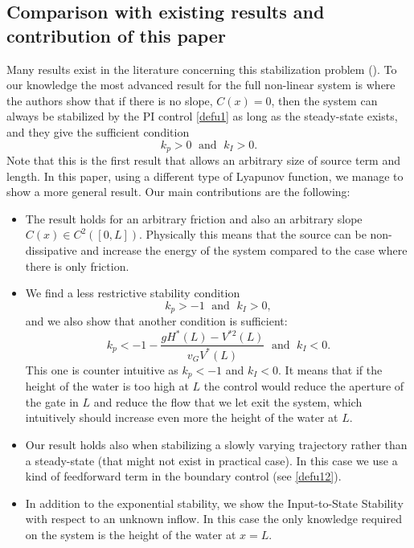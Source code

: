 \subsection{Comparison with existing results and contribution of this paper}
Many results exist in the literature concerning this stabilization problem (\eg \cite{dos2008, XuSallet, BastinCoron2013, XuSallet2014, Trinh2015, BastinCoronTamasoiu2015, BastinCoronPI}). To our knowledge the most advanced result for the full non-linear system is \cite{BastinCoronPI} where the authors show that if there is no slope, \ie $C(x) = 0$, then the system can always be stabilized by the PI control \eqref{defu1} as long as the steady-state exists, and they give the sufficient condition
\begin{equation*}%
k_{p}>0\;\text{ and }\;k_{I}>0.
\end{equation*}
Note that this is the first result that allows an arbitrary size of source term and length.
In this paper, using a different type of Lyapunov function, we manage to show a more general result. Our main contributions are the following:
\begin{itemize}
\item The result holds for an arbitrary friction and also an arbitrary slope $C(x)\in C^{2}([0,L])$. Physically this means that the source can be non-dissipative and increase the energy of the system compared to the case where there is only friction.
\item We find a less restrictive stability condition
\begin{equation*}
k_{p}>-1\;\text{ and }\;k_{I}>0,
\end{equation*}
and we also show that another condition is sufficient:
\begin{equation*}
k_{p}<-1-\frac{gH^{*}(L)-V^{*2}(L)}{v_{G}V^{*}(L)}\;\text{ and }\; k_{I}<0.
\end{equation*}
This one is counter intuitive as $k_{p}<-1$ and $k_{I}<0$. {{It} means that if the height of the water is too high at $L$ the control would reduce the aperture of the gate in $L$ and reduce the flow that we let exit the system,
which intuitively should increase even more the height of the water at $L$.}
\item Our result holds also when stabilizing a slowly varying trajectory rather than a steady-state (that might not exist in practical case). In this case we use a kind of feedforward term in the boundary control {(see \eqref{defu12})}.
\item In addition to the exponential stability, we show the Input-to-State Stability with respect to an unknown inflow. In this case the only knowledge required on the system is the height of the water at $x=L$.
\end{itemize}

